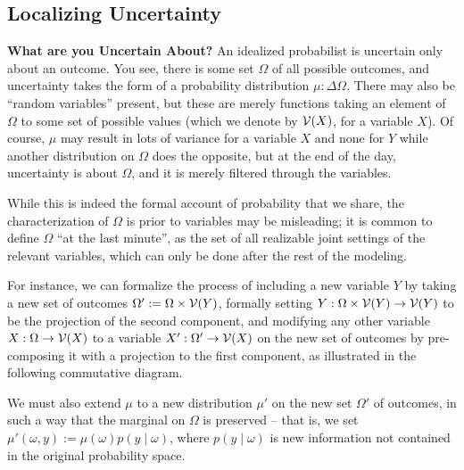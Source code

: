 \documentclass{article}
\begin{document}
	\subsection{Localizing Uncertainty}
    \textbf{What are you Uncertain About?}
    An idealized probabilist is uncertain only about an outcome. You see, there is some set $\Omega$ of all possible outcomes, and uncertainty takes the form of a probability distribution $\mu : \Delta\Omega$. There may also be ``random variables'' present, but these are merely functions taking an element of $\Omega$ to some set of possible values (which we denote by $\mathcal V(X)$, for a variable $X$).
    Of course, $\mu$ may result in lots of variance for a variable $X$ and none for $Y$ while another distribution on $\Omega$ does the opposite,
    but at the end of the day, uncertainty is about $\Omega$, and it is merely filtered through the variables.

    While this is indeed the formal account of probability that we share, the characterization of $\Omega$ is prior to variables may be misleading; it is common to define $\Omega$ ``at the last minute'', as the set of all realizable joint settings of the relevant variables, which can only be done after the rest of the modeling.

    \begin{example}
        For instance, we can formalize the process of including a new variable $Y$ by taking a new set of outcomes $\Omega' := \Omega \times \mathcal V(Y)$, formally setting $Y : \Omega \times \mathcal V(Y) \to \mathcal V(Y)$ to be the projection of the second component, and modifying any other variable $X : \Omega \to \mathcal V(X)$ to a variable $X' : \Omega' \to \mathcal V(X)$ on the new set of outcomes by pre-composing it with a projection to the first component, as illustrated in the following commutative diagram.
        \begin{center}
        \end{center}

        We must also extend $\mu$ to a new distribution $\mu'$ on the new set $\Omega'$ of outcomes, in such a way that the marginal on $\Omega$ is preserved -- that is, we set $\mu'(\omega, y) := \mu(\omega) p(y \mid \omega)$, where $p(y \mid \omega)$ is new information not contained in the original probability space.
    \end{example}
\end{document}
